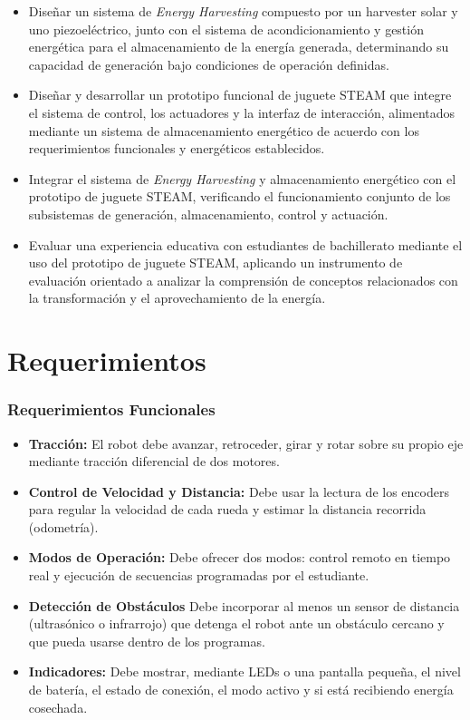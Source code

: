 \documentclass[11pt]{article}
\begin{document}
\begin{itemize}
    \item Diseñar un sistema de \textit{Energy Harvesting} compuesto por un harvester solar y uno piezoeléctrico, junto con el sistema de acondicionamiento y gestión energética para el almacenamiento de la energía generada, determinando su capacidad de generación bajo condiciones de operación definidas.
    
    \item Diseñar y desarrollar un prototipo funcional de juguete STEAM que integre el sistema de control, los actuadores y la interfaz de interacción, alimentados mediante un sistema de almacenamiento energético de acuerdo con los requerimientos funcionales y energéticos establecidos.
    
    \item Integrar el sistema de \textit{Energy Harvesting} y almacenamiento energético con el prototipo de juguete STEAM, verificando el funcionamiento conjunto de los subsistemas de generación, almacenamiento, control y actuación.

    \item Evaluar una experiencia educativa con estudiantes de bachillerato mediante el uso del prototipo de juguete STEAM, aplicando un instrumento de evaluación orientado a analizar la comprensión de conceptos relacionados con la transformación y el aprovechamiento de la energía.
     
\end{itemize}

\newpage
\section{Requerimientos}


\subsubsection{Requerimientos Funcionales}
\begin{itemize}
  \item \textbf{Tracción:} El robot debe avanzar, retroceder, girar y rotar sobre su propio eje mediante tracción diferencial de dos motores.
  \item \textbf{Control de Velocidad y Distancia:} Debe usar la lectura de los encoders para regular la velocidad de cada rueda y estimar la distancia recorrida (odometría).
  \item \textbf{Modos de Operación:} Debe ofrecer dos modos: control remoto en tiempo real y ejecución de secuencias programadas por el estudiante.
  \item \textbf{Detección de Obstáculos} Debe incorporar al menos un sensor de distancia (ultrasónico o infrarrojo) que detenga el robot ante un obstáculo cercano y que pueda usarse dentro de los programas.
  \item \textbf{Indicadores:} Debe mostrar, mediante LEDs o una pantalla pequeña, el nivel de batería, el estado de conexión, el modo activo y si está recibiendo energía cosechada.
\end{itemize}
 
\end{document}
